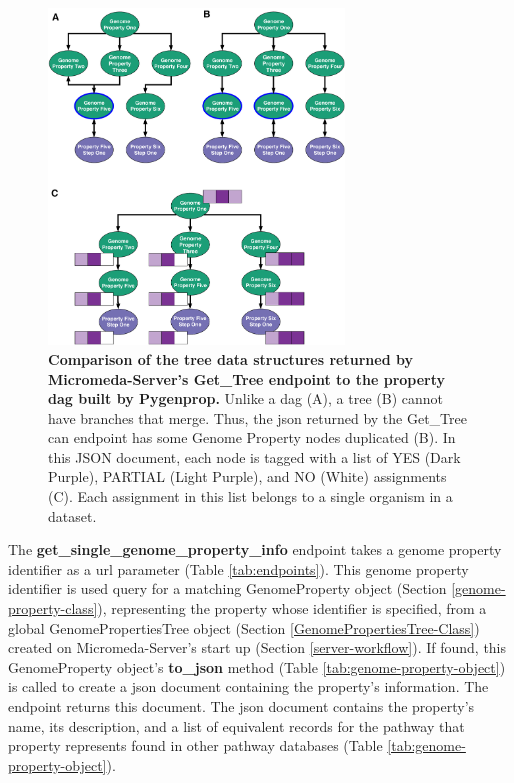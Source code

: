 \begin{figure}[!ht]
  \centering
	\includegraphics[width=0.70\textwidth]{media/Tree-JSON.pdf}
	 \caption[Comparison of the tree data structures returned by Micromeda-Server's 
Get\_Tree endpoint to the property DAG built by Pygenprop.]{\textbf{Comparison 
of the tree data structures returned by Micromeda-Server's Get\_Tree endpoint to 
the property \gls{dag} built by Pygenprop.} Unlike a \gls{dag} (A), a tree (B) 
cannot have branches that merge. Thus, the \gls{json} returned by the 
Get\_Tree can endpoint has some Genome Property nodes duplicated (B). In this 
JSON document, each node is tagged with a list of YES (Dark Purple), PARTIAL 
(Light Purple), and NO (White) assignments (C). Each assignment in this list 
belongs to a single organism in a dataset.}
	 \label{fig:tree-json}
\end{figure}

The \textbf{get\_single\_genome\_property\_info} endpoint takes a genome 
property identifier as a \gls{url} parameter (Table \ref{tab:endpoints}). This 
genome property identifier is used query for a matching GenomeProperty object 
(Section \ref{genome-property-class}), representing the property whose 
identifier is specified, from a global GenomePropertiesTree object (Section 
\ref{GenomePropertiesTree-Class}) created on Micromeda-Server's start up 
(Section \ref{server-workflow}). If found, this GenomeProperty object's 
\textbf{to\_json} method (Table \ref{tab:genome-property-object}) is called to 
create a \gls{json} document containing the property's information. The endpoint 
returns this document. The \gls{json} document contains the property's name, its 
description, and a list of equivalent records for the pathway that property 
represents found in other pathway databases (Table 
\ref{tab:genome-property-object}).

